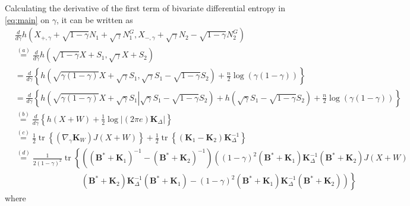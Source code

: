 \documentclass[journal,final, onecolumn]{IEEEtran}
\DeclareMathOperator{\tr}{tr}
\begin{document}
Calculating the derivative of the first term of bivariate differential entropy in \eqref{eq:main} on $\gamma$, it can be written as
\begin{align}
&\frac{d}{d\gamma}h\left(X_{+,\gamma}+\sqrt{1-\gamma}N_{1} + \sqrt{\gamma} N^{G}_{1},X_{-,\gamma}+ \sqrt{\gamma}N_{2}- \sqrt{1-\gamma}N^{G}_{2}\right)\nonumber \\
&\overset{(a)}=\frac{d}{d\gamma} h \left(   \sqrt{1-\gamma}X+S_{1}, \sqrt{\gamma}X+S_2         \right) \label{eq:ddev1}\\
&= \frac{d}{d\gamma}\left\{ h \left(   \sqrt{\gamma(1-\gamma)}X+\sqrt{\gamma}S_{1}, \sqrt{\gamma}S_{1} - \sqrt{1-\gamma} S_{2}       \right)+\frac{n}{2} \log \left(\gamma(1-\gamma)\right) \right\} \\
&=\frac{d}{d\gamma}\left\{ h \left( \left.  \sqrt{\gamma(1-\gamma)}X+\sqrt{\gamma}S_{1}\right| \sqrt{\gamma}S_{1} - \sqrt{1-\gamma} S_{2}       \right)+  h\left(\sqrt{\gamma}S_{1} - \sqrt{1-\gamma} S_{2}\right)+     \frac{n}{2} \log \left(\gamma(1-\gamma)\right) \right\} \\
&\overset{(b)}=\frac{d}{d\gamma}\left\{  h(X+W)    +\frac{1}{2} \log \left| (2 \pi e)   \boldsymbol{K}_{\Delta}     \right|                                            \right\} \\
& \overset{(c)}=\frac{1}{2}\tr \left\{      \left(   \nabla_\gamma \boldsymbol{K}_{W}  \right)    J(X+W)           \right\} +\frac{1}{2} \tr \left\{ \left(\boldsymbol{K}_{1}  - \boldsymbol{K}_{2}\right)  \boldsymbol{K}^{-1}_{\Delta}       \right\} \\
& \overset{(d)}=\frac{1}{2(1-\gamma)^2}\tr \left\{  \left(     (\boldsymbol{B}^{*} + \boldsymbol{K}_{1})^{-1} - (\boldsymbol{B}^{*} + \boldsymbol{K}_{2})^{-1}  \right) \left(   (1-\gamma)^{2}    (\boldsymbol{B}^{*} + \boldsymbol{K}_{1}) \boldsymbol{K}^{-1}_{\Delta}(\boldsymbol{B}^{*} + \boldsymbol{K}_{2}) J(X+W) \right.\right.\nonumber \\
& \qquad \qquad \qquad \qquad \left.\left.(\boldsymbol{B}^{*} + \boldsymbol{K}_{2}) \boldsymbol{K}^{-1}_{\Delta}(\boldsymbol{B}^{*} + \boldsymbol{K}_{1})  -(1-\gamma)^{2}(\boldsymbol{B}^{*} + \boldsymbol{K}_{1}) \boldsymbol{K}^{-1}_{\Delta}(\boldsymbol{B}^{*} + \boldsymbol{K}_{2})     \right)         \right\}\label{eq:dev1}
\end{align}
where
\end{document}

